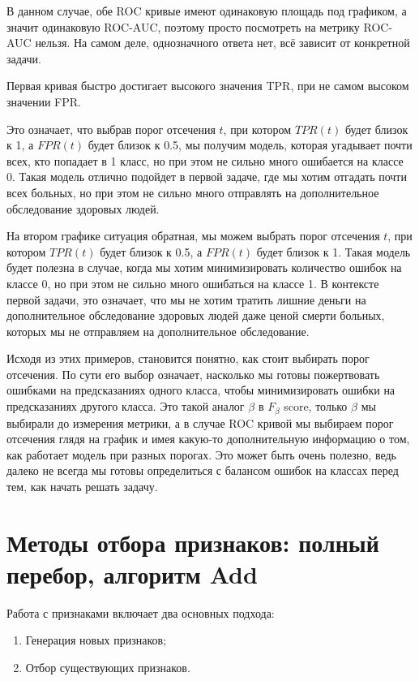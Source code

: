 \begin{solution}
В данном случае, обе ROC кривые имеют одинаковую площадь под графиком, а значит одинаковую ROC-AUC, поэтому просто посмотреть на метрику ROC-AUC нельзя.
На самом деле, однозначного ответа нет, всё зависит от конкретной задачи.

Первая кривая быстро достигает высокого значения TPR, при не самом высоком значении FPR.

Это означает, что выбрав порог отсечения $t$, при котором $TPR(t)$ будет близок к 1, а $FPR(t)$ будет близок к 0.5, мы получим модель,
которая угадывает почти всех, кто попадает в 1 класс, но при этом не сильно много ошибается на классе 0.
Такая модель отлично подойдет в первой задаче, где мы хотим отгадать почти всех больных, но при этом не сильно много отправлять на дополнительное обследование здоровых людей.

На втором графике ситуация обратная, мы можем выбрать порог отсечения $t$, при котором $TPR(t)$ будет близок к 0.5, а $FPR(t)$ будет близок к 1.
Такая модель будет полезна в случае, когда мы хотим минимизировать количество ошибок на классе 0, но при этом не сильно много ошибаться на классе 1.
В контексте первой задачи, это означает, что мы не хотим тратить лишние деньги на дополнительное обследование здоровых людей даже ценой смерти больных, которых мы не отправляем на дополнительное обследование.

Исходя из этих примеров, становится понятно, как стоит выбирать порог отсечения. По сути его выбор означает, насколько мы готовы пожертвовать ошибками на предсказаниях одного класса, чтобы минимизировать ошибки на предсказаниях другого класса.
Это такой аналог $\beta$ в $F_{\beta}$ score, только $\beta$ мы выбирали до измерения метрики, а в случае ROC кривой мы выбираем порог отсечения глядя на график и имея какую-то дополнительную информацию о том, как работает модель при разных порогах.
Это может быть очень полезно, ведь далеко не всегда мы готовы определиться с балансом ошибок на классах перед тем, как начать решать задачу.
\end{solution}


\section{Методы отбора признаков: полный перебор, алгоритм Add}

Работа с признаками включает два основных подхода:
\begin{enumerate}
    \item Генерация новых признаков;
    \item Отбор существующих признаков.
\end{enumerate}

